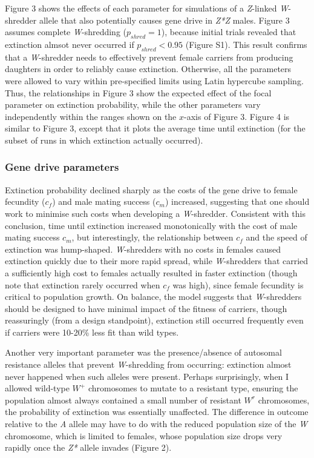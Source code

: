 \documentclass[]{rsos}%
\begin{document}
Figure 3 shows the effects of each parameter for simulations of a
\emph{Z}-linked \emph{W}-shredder allele that also potentially causes
gene drive in \emph{Z*Z} males. Figure 3 assumes complete
\emph{W}-shredding (\(p_{shred} = 1\)), because initial trials revealed
that extinction almsot never occurred if \(p_{shred} < 0.95\) (Figure
S1). This result confirms that a \emph{W}-shredder needs to effectively
prevent female carriers from producing daughters in order to reliably
cause extinction. Otherwise, all the parameters were allowed to vary
within pre-specified limits using Latin hypercube sampling. Thus, the
relationships in Figure 3 show the expected effect of the focal
parameter on extinction probability, while the other parameters vary
independently within the ranges shown on the \(x\)-axis of Figure 3.
Figure 4 is similar to Figure 3, except that it plots the average time
until extinction (for the subset of runs in which extinction actually
occurred).

\hypertarget{gene-drive-parameters}{%
\subsubsection{Gene drive parameters}\label{gene-drive-parameters}}

Extinction probability declined sharply as the costs of the gene drive
to female fecundity (\(c_f\)) and male mating success (\(c_m\))
increased, suggesting that one should work to minimise such costs when
developing a \emph{W}-shredder. Consistent with this conclusion, time
until extinction increased monotonically with the cost of male mating
success \(c_m\), but interestingly, the relationship between \(c_f\) and
the speed of extinction was hump-shaped. \emph{W}-shredders with no
costs in females caused extinction quickly due to their more rapid
spread, while \emph{W}-shredders that carried a sufficiently high cost
to females actually resulted in faster extinction (though note that
extinction rarely occurred when \(c_f\) was high), since female
fecundity is critical to population growth. On balance, the model
suggests that \emph{W}-shredders should be designed to have minimal
impact of the fitness of carriers, though reassuringly (from a design
standpoint), extinction still occurred frequently even if carriers were
10-20\% less fit than wild types.

Another very important parameter was the presence/absence of autosomal
resistance alleles that prevent \emph{W}-shredding from occurring:
extinction almost never happened when such alleles were present. Perhaps
surprisingly, when I allowed wild-type \(W^+\) chromosomes to mutate to
a resistant type, ensuring the population almost always contained a
small number of resistant \(W^r\) chromosomes, the probability of
extinction was essentially unaffected. The difference in outcome
relative to the \emph{A} allele may have to do with the reduced
population size of the \emph{W} chromosome, which is limited to females,
whose population size drops very rapidly once the \emph{Z*} allele
invades (Figure 2).
\end{document}
